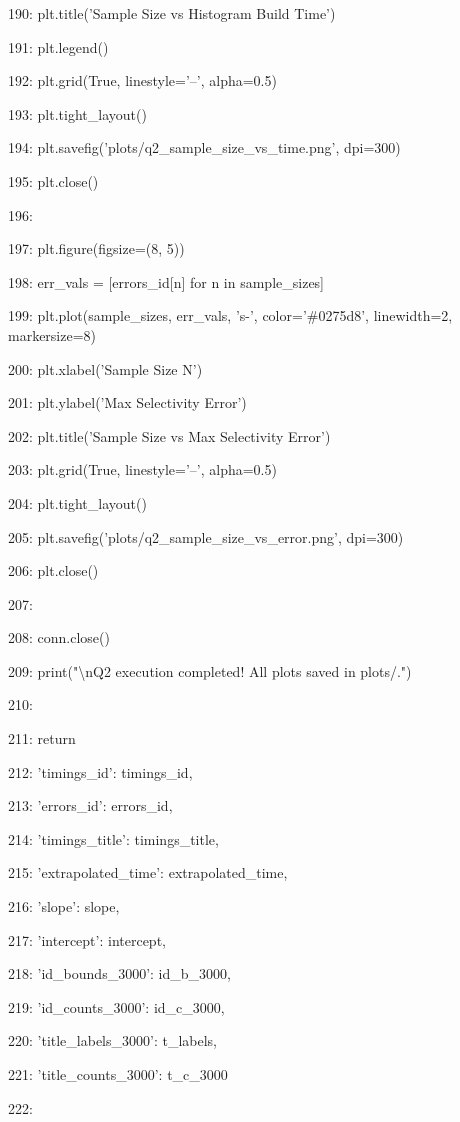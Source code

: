 \documentclass[11pt,a4paper]{article}
\begin{document}
190:     plt.title('Sample Size vs Histogram Build Time')

191:     plt.legend()

192:     plt.grid(True, linestyle='--', alpha=0.5)

193:     plt.tight\_layout()

194:     plt.savefig('plots/q2\_sample\_size\_vs\_time.png', dpi=300)

195:     plt.close()

196:

197:     plt.figure(figsize=(8, 5))

198:     err\_vals = [errors\_id[n] for n in sample\_sizes]

199:     plt.plot(sample\_sizes, err\_vals, 's-', color='\#0275d8', linewidth=2, markersize=8)

200:     plt.xlabel('Sample Size N')

201:     plt.ylabel('Max Selectivity Error')

202:     plt.title('Sample Size vs Max Selectivity Error')

203:     plt.grid(True, linestyle='--', alpha=0.5)

204:     plt.tight\_layout()

205:     plt.savefig('plots/q2\_sample\_size\_vs\_error.png', dpi=300)

206:     plt.close()

207:

208:     conn.close()

209:     print("\textbackslash{}nQ2 execution completed! All plots saved in plots/.")

210:

211:     return {

212:         'timings\_id': timings\_id,

213:         'errors\_id': errors\_id,

214:         'timings\_title': timings\_title,

215:         'extrapolated\_time': extrapolated\_time,

216:         'slope': slope,

217:         'intercept': intercept,

218:         'id\_bounds\_3000': id\_b\_3000,

219:         'id\_counts\_3000': id\_c\_3000,

220:         'title\_labels\_3000': t\_labels,

221:         'title\_counts\_3000': t\_c\_3000

222:     }
\end{document}
